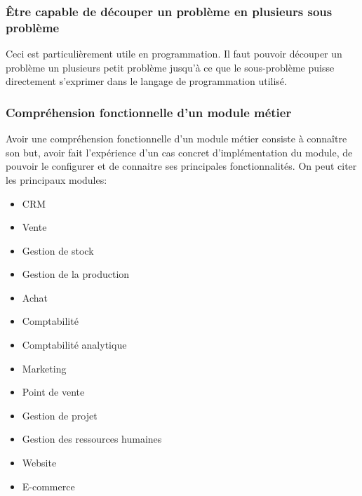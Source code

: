 \subsubsection{Être capable de découper un problème en plusieurs sous problème}
Ceci est particulièrement utile en programmation. Il faut pouvoir découper un problème un plusieurs petit problème jusqu'à ce que le sous-problème puisse directement s'exprimer dans le langage de programmation utilisé. 
\subsubsection{Compréhension fonctionnelle d'un module métier}
Avoir une compréhension fonctionnelle d'un module métier consiste à connaître son but, avoir fait l'expérience d'un cas concret d'implémentation du module, de pouvoir le configurer et de connaitre ses principales fonctionnalités. On peut citer les principaux modules:
\begin{itemize}
 \item CRM
 \item Vente
 \item Gestion de stock
 \item Gestion de la production
 \item Achat
 \item Comptabilité 
 \item Comptabilité analytique
 \item Marketing
 \item Point de vente
 \item Gestion de projet
 \item Gestion des ressources humaines
 \item Website
 \item E-commerce
\end{itemize}



